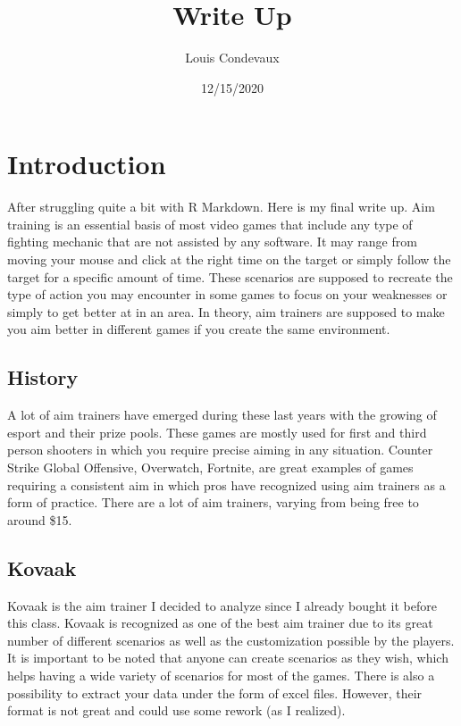 \documentclass[
]{article}
\title{Write Up}
\author{Louis Condevaux}
\date{12/15/2020}
\begin{document}
\maketitle

\section*{Introduction}

After struggling quite a bit with R Markdown. Here is my final write up.
Aim training is an essential basis of most video games that include any
type of fighting mechanic that are not assisted by any software. It may
range from moving your mouse and click at the right time on the target
or simply follow the target for a specific amount of time. These
scenarios are supposed to recreate the type of action you may encounter
in some games to focus on your weaknesses or simply to get better at in
an area. In theory, aim trainers are supposed to make you aim better in
different games if you create the same environment.

\subsection{History}

A lot of aim trainers have emerged during these last years with the
growing of esport and their prize pools. These games are mostly used for
first and third person shooters in which you require precise aiming in
any situation. Counter Strike Global Offensive, Overwatch, Fortnite, are
great examples of games requiring a consistent aim in which pros have
recognized using aim trainers as a form of practice. There are a lot of
aim trainers, varying from being free to around \$15.

\subsection{Kovaak}

Kovaak is the aim trainer I decided to analyze since I already bought it
before this class. Kovaak is recognized as one of the best aim trainer
due to its great number of different scenarios as well as the
customization possible by the players. It is important to be noted that
anyone can create scenarios as they wish, which helps having a wide
variety of scenarios for most of the games. There is also a possibility
to extract your data under the form of excel files. However, their
format is not great and could use some rework (as I realized).
\end{document}
